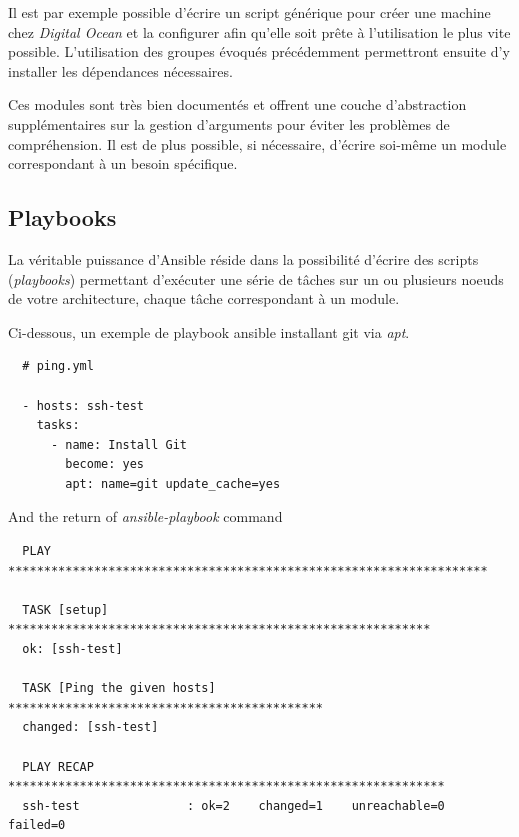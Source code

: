 \documentclass[11pt,a4paper]{article}
\begin{document}
  Il est par exemple possible d'écrire un script générique pour créer une
  machine chez \emph{Digital Ocean} et la configurer afin qu'elle soit
  prête à l'utilisation le plus vite possible. L'utilisation des groupes
  évoqués précédemment permettront ensuite d'y installer les dépendances
  nécessaires.

  \bigskip

  Ces modules sont très bien documentés et offrent une couche
  d'abstraction supplémentaires sur la gestion d'arguments pour éviter les
  problèmes de compréhension. Il est de plus possible, si nécessaire,
  d'écrire soi-même un module correspondant à un besoin spécifique.

  \newpage

  \subsection{Playbooks}\label{playbooks}

  La véritable puissance d'Ansible réside dans la possibilité d'écrire des
  scripts (\emph{playbooks}) permettant d'exécuter une série de tâches sur
  un ou plusieurs noeuds de votre architecture, chaque tâche correspondant
  à un module.

  \bigskip

  Ci-dessous, un exemple de playbook ansible installant git via
  \emph{apt}.

  \begin{verbatim}
  # ping.yml

  - hosts: ssh-test
    tasks:
      - name: Install Git
        become: yes
        apt: name=git update_cache=yes
  \end{verbatim}

  And the return of \emph{ansible-playbook} command

  \begin{verbatim}
  PLAY *******************************************************************

  TASK [setup] ***********************************************************
  ok: [ssh-test]

  TASK [Ping the given hosts] ********************************************
  changed: [ssh-test]

  PLAY RECAP *************************************************************
  ssh-test               : ok=2    changed=1    unreachable=0    failed=0
  \end{verbatim}

  \bigskip
\end{document}

